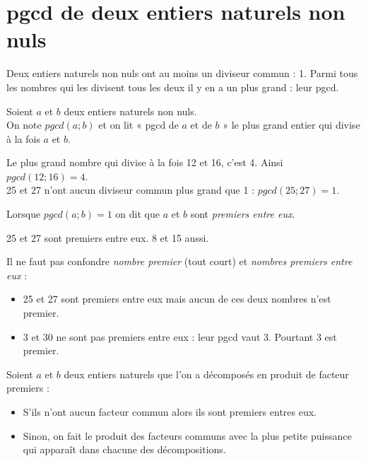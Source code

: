 \section{pgcd de deux entiers naturels non nuls}

Deux entiers naturels non nuls ont au moins un diviseur commun : 1. Parmi tous les nombres qui les divisent tous les deux il y en a un plus grand : leur pgcd.

\begin{definition}[]
	Soient $a$ et $b$ deux entiers naturels non nuls.\\
	On note $pgcd(a;b)$ et on lit  «  pgcd de $a$ et de $b$ »  le plus grand entier qui divise à la fois $a$ et $b$.
\end{definition}

\begin{exemple}[s]
	Le plus grand nombre qui divise à la fois 12 et 16, c'est 4. Ainsi $pgcd(12;16)=4$.\\
	25 et 27 n'ont aucun diviseur commun plus grand que 1 : $pgcd(25;27)=1$.\\
\end{exemple}

\begin{definition}[]
	Lorsque $pgcd(a;b)=1$ on dit que $a$ et $b$ sont \textit{premiers entre eux}.
\end{definition}

\begin{exemple}[s]
	25 et 27 sont premiers entre eux. 8 et 15 aussi.
\end{exemple}

\begin{remarque}[]
	Il ne faut pas confondre \textit{nombre premier} (tout court) et \textit{nombres premiers entre eux} :
	\begin{itemize}
		\item 	25 et 27 sont premiers entre eux mais aucun de ces deux nombres n'est premier.
		\item 	3 et 30 ne sont pas premiers entre eux : leur pgcd vaut 3. Pourtant 3 est premier.
	\end{itemize}
\end{remarque}

\begin{methode}[]
	Soient $a$ et $b$ deux entiers naturels que l'on a décomposés en produit de facteur premiers :
	\begin{itemize}
		\item 	S'ils n'ont aucun facteur commun alors ils sont premiers entres eux.
		\item 	Sinon, on fait le produit des facteurs communs avec la plus petite puissance qui apparaît dans chacune des décompositions.
	\end{itemize}
\end{methode}

